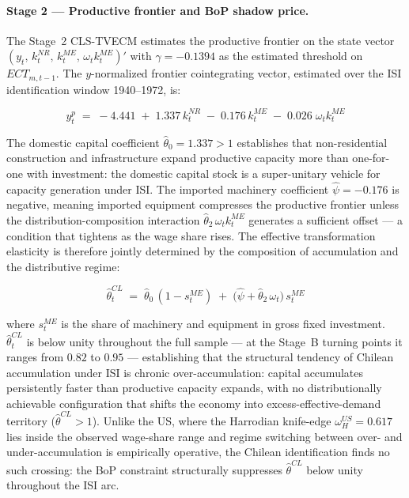\documentclass[11pt,a4paper]{article}
\begin{document}
{\paragraph{Stage 2 --- Productive frontier and BoP shadow price.}

The Stage~2 CLS-TVECM estimates the productive frontier on the state
vector $(y_t,\,k_t^{NR},\,k_t^{ME},\,\omega_t k_t^{ME})'$ with
$\hat{\gamma} = -0.1394$ as the estimated threshold on $ECT_{m,t-1}$.
The $y$-normalized frontier cointegrating vector, estimated over the
ISI identification window 1940--1972, is:

\begin{equation}
    y_t^{p} \;=\; -4.441
             \;+\; 1.337\,k_t^{NR}
             \;-\; 0.176\,k_t^{ME}
             \;-\; 0.026\;\omega_t k_t^{ME}
    \label{eq:cl:frontier_cv}
\end{equation}

The domestic capital coefficient $\hat{\theta}_0 = 1.337 > 1$ establishes
that non-residential construction and infrastructure expand productive
capacity more than one-for-one with investment: the domestic capital
stock is a super-unitary vehicle for capacity generation under ISI.
The imported machinery coefficient $\hat{\psi} = -0.176$ is negative,
meaning imported equipment compresses the productive frontier unless the
distribution-composition interaction $\hat{\theta}_2\,\omega_t k_t^{ME}$
generates a sufficient offset --- a condition that tightens as the wage
share rises. The effective transformation elasticity is therefore jointly
determined by the composition of accumulation and the distributive regime:

\begin{equation}
    \hat{\theta}^{CL}_t \;=\;
        \hat{\theta}_0\,(1 - s_t^{ME})
        \;+\;
        \bigl(\hat{\psi} + \hat{\theta}_2\,\omega_t\bigr)\,s_t^{ME}
    \label{eq:cl:theta_stageA}
\end{equation}

where $s_t^{ME}$ is the share of machinery and equipment in gross fixed
investment. $\hat{\theta}^{CL}_t$ is below unity throughout the full
sample --- at the Stage~B turning points it ranges from $0.82$ to
$0.95$ --- establishing that the structural tendency of Chilean
accumulation under ISI is chronic over-accumulation: capital accumulates
persistently faster than productive capacity expands, with no
distributionally achievable configuration that shifts the economy into
excess-effective-demand territory ($\hat{\theta}^{CL} > 1$). Unlike the
US, where the Harrodian knife-edge $\omega_H^{US} = 0.617$ lies inside
the observed wage-share range and regime switching between over- and
under-accumulation is empirically operative, the Chilean identification
finds no such crossing: the BoP constraint structurally suppresses
$\hat{\theta}^{CL}$ below unity throughout the ISI arc.

}
\end{document}

